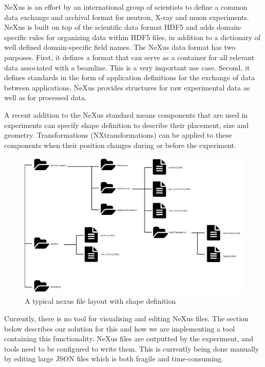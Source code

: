 NeXus is an effort by an international group of scientists to define a common data exchange and archival format for neutron, X-ray and muon experiments. NeXus is built on top of the scientific data format HDF5 and adds domain-specific rules for organizing data within HDF5 files, in addition to a dictionary of well defined domain-specific field names. The NeXus data format has two purposes. First, it defines a format that can serve as a container for all relevant data associated with a beamline. This is a very important use case. Second, it defines standards in the form of application definitions for the exchange of data between applications. NeXus provides structures for raw experimental data as well as for processed data.

A recent addition to the NeXus standard means components that are used in experiments can specify shape definition to describe their placement, size and geometry. Transformations (NXtransformations) can be applied to these components when their position changes during or before the experiment. 

\begin{figure}
\caption{A typical nexus file layout with shape definition}
\includegraphics[width=\linewidth]{nexusdiagram.png}
\end{figure}

Currently, there is no tool for visualising and editing NeXus files. The section below describes our solution for this and how we are implementing a tool containing this functionality. NeXus files are outputted by the experiment, and tools need to be configured to write them. This is currently being done manually by editing large JSON files which is both fragile and time-consuming.
